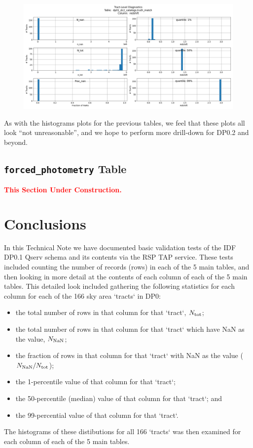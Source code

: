 \documentclass[DM,authoryear,toc]{lsstdoc}
\begin{document}
\begin{figure}[h]
\centering
\includegraphics[width=1.0\linewidth]{Plots/TAP_verify_DP01.dp01_dc2_catalogs.truth_match.redshift.png}
\caption{}
\label{fig:truth_match_redshift}
\end{figure}


As with the histograms plots for the previous tables, we feel that
these plots all look ``not unreasonable'', and we hope to perform more
drill-down for DP0.2 and beyond.


\subsection{\texttt{forced\_photometry} Table} \label{sec:forced_photometry}


\textcolor{red}{\bf{This Section Under Construction.}}


\section{Conclusions} \label{sec:conclusions}

In this Technical Note we have documented basic validation tests of
the IDF DP0.1 Qserv schema and its contents via the RSP TAP service.
These tests included counting the number of records (rows) in each of
the 5 main tables, and then looking in more detail at the contents of
each column of each of the 5 main tables.  This detailed look included
gathering the following statistics for each column for each of the 166
sky area `tracts` in DP0:
\begin{itemize}
\item the total number of rows in that column for that `tract`, $N_{\rm tot}$;
\item the total number of rows in that column for that `tract` which have NaN as the value, $N_{\rm NaN}$;
\item the fraction of rows in that column for that `tract` with NaN as the value ($N_{\rm NaN} / N_{\rm tot}$);
\item the 1-percentile value of that column for that `tract`;
\item the 50-percentile (median) value of that column for that `tract`; and 
\item the 99-percential value of that column for that `tract`.
\end{itemize}
The histograms of these distibutions for all 166 `tracts` was then
examined for each column of each of the 5 main tables.
\end{document}
